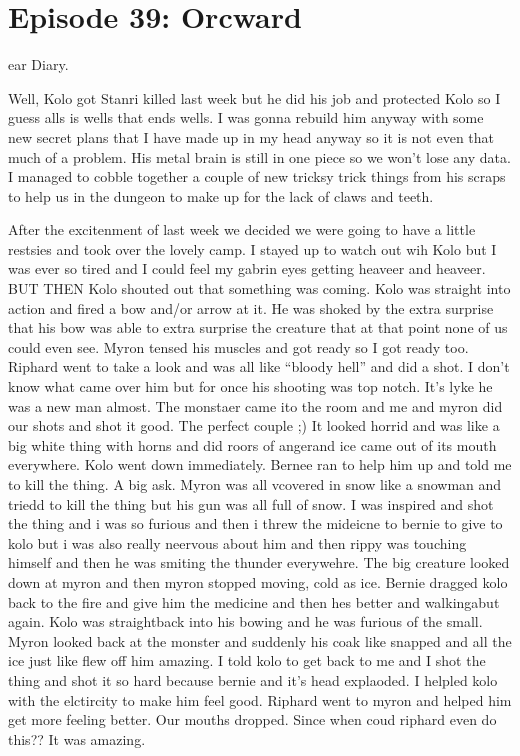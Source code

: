 \section{Episode 39: Orcward}

\medskip

ear Diary.\medskip

Well, Kolo got Stanri killed last week but he did his job and protected Kolo so I guess alls is wells that ends wells. I was gonna rebuild him anyway with some new secret plans that I have made up in my head anyway so it is not even that much of a problem. His metal brain is still in one piece so we won’t lose any data. I managed to cobble together a couple of new tricksy trick things from his scraps to help us in the dungeon to make up for the lack of claws and teeth.\medskip

After the excitenment of last week we decided we were going to have a little restsies and took over the lovely camp. I stayed up to watch out wih Kolo but I was ever so tired and I could feel my gabrin eyes getting heaveer and heaveer. BUT THEN Kolo shouted out that something was coming. Kolo was straight into action and fired a bow and/or arrow at it. He was shoked by the extra surprise that his bow was able to extra surprise the creature that at that point none of us could even see. Myron tensed his muscles and got ready so I got ready too. Riphard went to take a look and was all like “bloody hell” and did a shot. I don’t know what came over him but for once his shooting was top notch. It’s lyke he was a new man almost. The monstaer came ito the room and me and myron did our shots and shot it good. The perfect couple ;) It looked horrid and was like a big white thing with horns and did roors of angerand ice came out of its mouth everywhere. Kolo went down immediately. Bernee ran to help him up and told me to kill the thing. A big ask. Myron was all vcovered in snow like a snowman and triedd to kill the thing but his gun was all full of snow. I was inspired and shot the thing and i was so furious and then i threw the mideicne to bernie to give to kolo but i was also really neervous about him and then rippy was touching himself and then he was smiting the thunder everywehre. The big creature looked down at myron and then myron stopped moving, cold as ice. Bernie dragged kolo back to the fire and give him the medicine and then hes better and walkingabut again. Kolo was straightback into his bowing and he was furious of the small. Myron looked back at the monster and suddenly his coak like snapped and all the ice just like flew off him amazing. I told kolo to get back to me and I shot the thing and shot it so hard because bernie and it’s head explaoded. I helpled kolo with the elctircity to make him feel good. Riphard went to myron and helped him get more feeling better. Our mouths dropped. Since when coud riphard even do this?? It was amazing.\medskip

